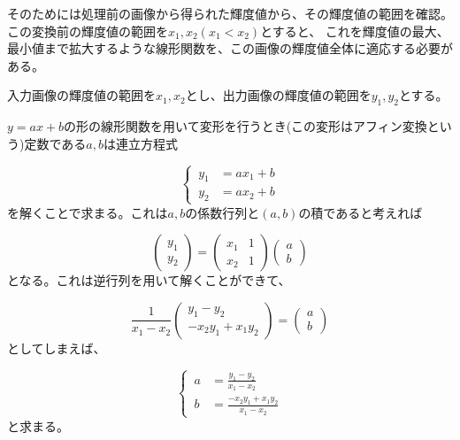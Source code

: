 \documentclass[a4paper,11pt,dvipdfmx]{jsarticle}
\begin{document}
そのためには処理前の画像から得られた輝度値から、その輝度値の範囲を確認。この変換前の輝度値の範囲を$x_1,x_2(x_1<x_2)$とすると、
これを輝度値の最大、最小値まで拡大するような線形関数を、この画像の輝度値全体に適応する必要がある。

入力画像の輝度値の範囲を$x_1,x_2$とし、出力画像の輝度値の範囲を$y_1,y_2$とする。

$y=ax+b$の形の線形関数を用いて変形を行うとき(この変形はアフィン変換という)定数である$a,b$は連立方程式

\begin{equation}
    \left \{ \,
    \begin{aligned}
        y_1 &= ax_1 + b \\
        y_2 &= ax_2 + b
    \end{aligned}
    \right .
\end{equation}
を解くことで求まる。これは$a,b$の係数行列と$(a,b)$の積であると考えれば

\begin{equation}
    \begin{pmatrix}
        y_1 \\ y_2
    \end{pmatrix}
    =
    \begin{pmatrix}
        x_1 & 1 \\
        x_2 & 1
    \end{pmatrix}
    \begin{pmatrix}
        a \\ b
    \end{pmatrix}
\end{equation}
となる。これは逆行列を用いて解くことができて、

\begin{equation}
    \frac{1}{x_1-x_2}
    \begin{pmatrix}
        y_1 - y_2 \\ -x_2y_1 + x_1y_2
    \end{pmatrix}
    =
    \begin{pmatrix}
        a \\ b
    \end{pmatrix}
\end{equation}
としてしまえば、

\begin{equation}
    \left \{ \,
    \begin{aligned}
        a &= \frac{y_1-y_2}{x_1-x_2} \\
        b &= \frac{-x_2y_1+x_1y_2}{x_1-x_2}
    \end{aligned}
    \right .
\end{equation}
と求まる。
\end{document}
